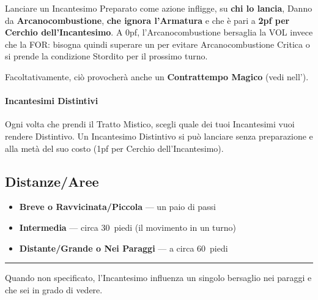 \documentclass[itdr]{subfiles}
\begin{document}
Lanciare un Incantesimo Preparato come azione infligge, su \textbf{chi lo lancia}, \mbox{Danno} da \mbox{\textbf{Arcanocombustione}}, \textbf{che ignora l’Armatura} e che è pari a \textbf{2pf per Cerchio dell’Incantesimo}. A 0pf, l’Arcanocombustione bersaglia la VOL \mbox{invece} che la FOR: bisogna quindi superare un  per evitare Arcanocombustione Critica o si prende la condizione Stordito per il prossimo turno.

\begin{dbox}
	Facoltativamente, ciò provocherà anche un \textbf{Contrattempo Magico} (vedi \textbf{} nell'\textbf{}).
\end{dbox}

\vfill
{}
\paragraph{Incantesimi Distintivi}
Ogni volta che prendi il Tratto Mistico, scegli quale dei tuoi Incantesimi vuoi rendere Distintivo. Un Incantesimo Distintivo si può lanciare senza preparazione e alla metà del suo costo (1pf per Cerchio dell’Incantesimo).

\vfill
{}

\break

\begin{dbox}
	\subsection*{Distanze/Aree}
	\begin{itemize}
		\item \textbf{Breve o Ravvicinata/Piccola} --- un paio di passi
		\item \textbf{Intermedia} --- circa 30~piedi (il movimento in un turno)
		\item \textbf{Distante/Grande o Nei Paraggi} --- a circa 60~piedi
	\end{itemize}
	\vspace{1ex}
	\hrule
	\vspace{1ex}
	Quando non specificato, l’Incantesimo influenza un singolo bersaglio nei paraggi e che sei in grado di vedere.
\end{dbox}
\end{document}
